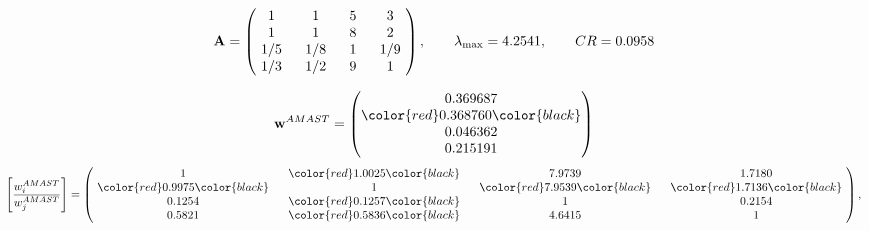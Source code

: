 \begin{example}
\begin{equation*}
\mathbf{A} =
\begin{pmatrix}
$\,\,$ 1 $\,\,$ & $\,\,$1$\,\,$ & $\,\,$5$\,\,$ & $\,\,$3 $\,\,$ \\
$\,\,$ 1 $\,\,$ & $\,\,$ 1 $\,\,$ & $\,\,$8$\,\,$ & $\,\,$2 $\,\,$ \\
$\,\,$ 1/5$\,\,$ & $\,\,$ 1/8$\,\,$ & $\,\,$ 1 $\,\,$ & $\,\,$ 1/9 $\,\,$ \\
$\,\,$ 1/3$\,\,$ & $\,\,$ 1/2$\,\,$ & $\,\,$9$\,\,$ & $\,\,$ 1  $\,\,$ \\
\end{pmatrix},
\qquad
\lambda_{\max} =
4.2541,
\qquad
CR = 0.0958
\end{equation*}

\begin{equation*}
\mathbf{w}^{AMAST} =
\begin{pmatrix}
0.369687\\
\color{red} 0.368760\color{black} \\
0.046362\\
0.215191
\end{pmatrix}\end{equation*}
\begin{equation*}
\left[ \frac{{w}^{AMAST}_i}{{w}^{AMAST}_j} \right] =
\begin{pmatrix}
$\,\,$ 1 $\,\,$ & $\,\,$\color{red} 1.0025\color{black} $\,\,$ & $\,\,$7.9739$\,\,$ & $\,\,$1.7180$\,\,$ \\
$\,\,$\color{red} 0.9975\color{black} $\,\,$ & $\,\,$ 1 $\,\,$ & $\,\,$\color{red} 7.9539\color{black} $\,\,$ & $\,\,$\color{red} 1.7136\color{black}   $\,\,$ \\
$\,\,$0.1254$\,\,$ & $\,\,$\color{red} 0.1257\color{black} $\,\,$ & $\,\,$ 1 $\,\,$ & $\,\,$0.2154 $\,\,$ \\
$\,\,$0.5821$\,\,$ & $\,\,$\color{red} 0.5836\color{black} $\,\,$ & $\,\,$4.6415$\,\,$ & $\,\,$ 1  $\,\,$ \\
\end{pmatrix},
\end{equation*}


\end{example}
